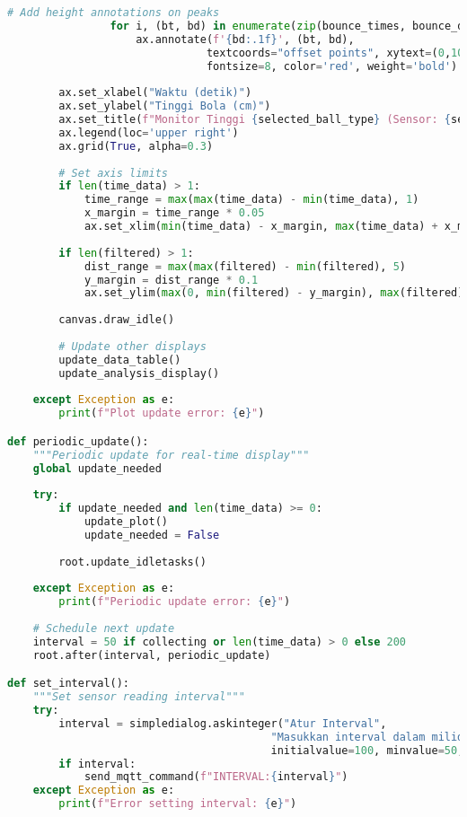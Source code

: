 \begin{itemize}
\begin{scriptsize}
\begin{lstlisting}[language=python]
                # Add height annotations on peaks
                for i, (bt, bd) in enumerate(zip(bounce_times, bounce_distances)):
                    ax.annotate(f'{bd:.1f}', (bt, bd), 
                               textcoords="offset points", xytext=(0,10), ha='center',
                               fontsize=8, color='red', weight='bold')
        
        ax.set_xlabel("Waktu (detik)")
        ax.set_ylabel("Tinggi Bola (cm)")
        ax.set_title(f"Monitor Tinggi {selected_ball_type} (Sensor: {sensor_height}cm, Ambang: {bounce_threshold}cm)")
        ax.legend(loc='upper right')
        ax.grid(True, alpha=0.3)
        
        # Set axis limits
        if len(time_data) > 1:
            time_range = max(max(time_data) - min(time_data), 1)
            x_margin = time_range * 0.05
            ax.set_xlim(min(time_data) - x_margin, max(time_data) + x_margin)
        
        if len(filtered) > 1:
            dist_range = max(max(filtered) - min(filtered), 5)
            y_margin = dist_range * 0.1
            ax.set_ylim(max(0, min(filtered) - y_margin), max(filtered) + y_margin)
        
        canvas.draw_idle()
        
        # Update other displays
        update_data_table()
        update_analysis_display()
        
    except Exception as e:
        print(f"Plot update error: {e}")

def periodic_update():
    """Periodic update for real-time display"""
    global update_needed
    
    try:
        if update_needed and len(time_data) >= 0:
            update_plot()
            update_needed = False
        
        root.update_idletasks()
        
    except Exception as e:
        print(f"Periodic update error: {e}")
    
    # Schedule next update
    interval = 50 if collecting or len(time_data) > 0 else 200
    root.after(interval, periodic_update)

def set_interval():
    """Set sensor reading interval"""
    try:
        interval = simpledialog.askinteger("Atur Interval", 
                                         "Masukkan interval dalam milidetik (50-5000):",
                                         initialvalue=100, minvalue=50, maxvalue=5000)
        if interval:
            send_mqtt_command(f"INTERVAL:{interval}")
    except Exception as e:
        print(f"Error setting interval: {e}")


\end{lstlisting}
\end{scriptsize}
\end{itemize}
